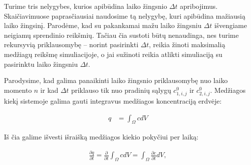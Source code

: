 Turime tris nelygybes, kurios apibūdina laiko žingsnio $\Delta t$ apribojimus. Skaičiavimuose paprasčiausiai naudosime tą nelygybę, kuri apibūdina mažiausią laiko žingsinį. Parodėme, kad su pakankamai mažu laiko žingsniu $\Delta t$ išvengiame neigiamų sprendinio reikšmių. Tačiau čia sustoti būtų nenaudinga, nes turime rekursyvią priklausomybę -- norint pasirinkti $\Delta t$, reikia žinoti maksimalią medžiagų reikšmę simuliacijoje, o jai sužinoti reikia atlikti simuliaciją su pasirinktu laiko žingsniu $\Delta t$.

Parodysime, kad galima panaikinti laiko žingsnio priklausomybę nuo laiko momento $n$ ir kad $\Delta t$ priklauso tik nuo pradinių sąlygų $c^0_{1,i,j}$ ir $c^0_{2,i,j}$. Medžiagos kiekį sistemoje galima gauti integravus medžiagos koncentraciją erdvėje:

\begin{align}
  q&=\int_\Omega c dV \label{quantity-general}
\end{align}

Iš čia galime išvesti išraišką medžiagos kiekio pokyčiui per laiką:

\begin{align}
  \frac{\partial q}{\partial t}=\frac{\partial}{\partial t}\int_\Omega c dV=\int_\Omega\frac{\partial c}{\partial t}dV,
\end{align}

